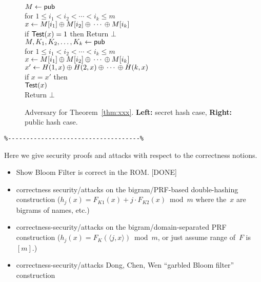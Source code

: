 \begin{figure}
\centering
{}
{
\\
$M \gets {\sf pub}$\\
for $1 \leq i_1 < i_2 < \cdots < i_k \leq m$\\
\nudge $x \gets M[i_1] {\:\oplus\:} M[i_2] {\:\oplus\:} \cdots {\:\oplus\:} M[i_k]$\\
\nudge if $\mathsf{Test}(x)=1$ then Return $\bot$
}
{
\\
$M,K_1,K_2,\ldots,K_k \gets {\sf pub}$\\
for $1 \leq i_1 < i_2 < \cdots < i_k \leq m$\\
\nudge $x \gets M[i_1] {\:\oplus\:} M[i_2] {\:\oplus\:} \cdots {\:\oplus\:} M[i_k]$\\
\nudge $x' \gets H(1,x) {\:\oplus\:} H(2,x) {\:\oplus\:} \cdots {\:\oplus\:} H(k,x)$\\
\nudge if $x=x'$ then\\
\nudge\nudge $\mathsf{Test}(x)$\\
\nudge\nudge Return $\bot$\\
}

\caption{Adversary for Theorem~\ref{thm:xxx}.  \textbf{Left:} secret hash case, \textbf{Right:} public hash case.}
\label{fig:adv-bi-lin-ss}
\end{figure}



\begin{verbatim}
%------------------------------------%
\end{verbatim}


  Here we give security proofs and attacks with respect to the correctness notions.
\begin{itemize}
\item Show Bloom Filter is correct in the ROM.  [DONE]
\item correctness security/attacks on the bigram/PRF-based double-hashing construction ($h_j(x) = F_{K1}(x) + j\cdot F_{K2}(x) \bmod m$ where the~$x$ are bigrams of names, etc.)
\item correctness-security/attacks on the bigram/domain-separated PRF construction ($h_j(x)=F_K(\langle j,x \rangle) \bmod m$, or just assume range of~$F$ is $[m]$.)
\item correctness-security/attacks Dong, Chen, Wen ``garbled Bloom filter'' construction

\end{itemize}

